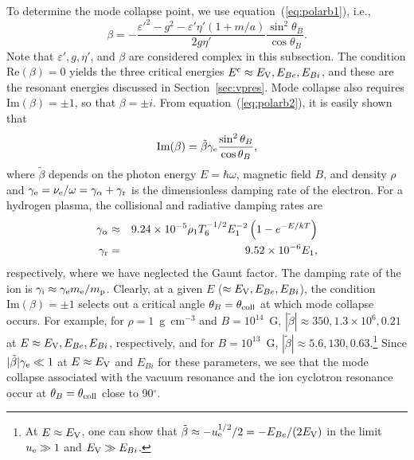 \documentclass{mn2e}
\newcommand{\be}{\begin{equation}}
\newcommand{\ee}{\end{equation}}
\newcommand{\ba}{\begin{eqnarray}}
\newcommand{\ea}{\end{eqnarray}}
\newcommand{\lp}{\left(}
\newcommand{\rp}{\right)}
\newcommand{\mpr}{m_{\rm p}}
\newcommand{\me}{m_{\rm e}}
\newcommand{\Ebe}{E_{Be}}
\newcommand{\Ebi}{E_{Bi}}
\newcommand{\thetab}{\theta_B}
\newcommand{\polarb}{\beta}
\newcommand{\uel}{u_{\rm e}}
\newcommand{\nudamp}{\nu_{\rm e}}
\newcommand{\gamdampi}{\gamma_{\rm i}}
\newcommand{\gamdampre}{\gamma_{\rm r}}
\newcommand{\gamdampce}{\gamma_{\alpha}}
\newcommand{\vpa}{a}
\newcommand{\vpm}{m}
\newcommand{\Evp}{E_{\rm V}}
\newcommand{\polarbmcp}{\tilde{\beta}}
\newcommand{\gamdampe}{\gamma_{\rm e}}
\newcommand{\thetamcp}{\theta_{\rm coll}}
\begin{document}
{To determine the mode collapse point, we use equation~(\ref{eq:polarb1}),
i.e.,
\be
\polarb = -\frac{\varepsilon'^2-g^2-\varepsilon'\eta'
\lp 1+\vpm/\vpa\rp}{2g\eta'}\frac{\sin^2\thetab}{\cos\thetab}.
 \label{eq:polarb2}
\ee
Note that $\varepsilon', g, \eta'$, and $\polarb$ are considered
complex in this subsection.
The condition $\mbox{Re}(\polarb)=0$ yields the three
critical energies $E^{\rm c}\approx \Evp, \Ebe, \Ebi$, and these
are the resonant energies discussed in Section~\ref{sec:vpres}.
Mode collapse also requires $\mbox{Im}(\polarb)=\pm 1$, so that
$\polarb=\pm i$.  From equation~(\ref{eq:polarb2}), it is easily
shown that
\be
\mbox{Im}(\polarb)=\polarbmcp\gamdampe\frac{\sin^2\thetab}{\cos\thetab},
 \label{eq:polarbim}
\ee
where $\polarbmcp$ depends on the photon energy $E=\hbar\omega$, magnetic
field $B$, and density $\rho$ and
$\gamdampe=\nudamp/\omega=\gamdampce+\gamdampre$ is the dimensionless
damping rate of the electron. For a hydrogen plasma, the collisional
and radiative damping rates are
\ba
\gamdampce & \approx & 9.24\times 10^{-5} \rho_1 T_6^{-1/2} E_1^{-2}
 \lp 1-e^{-E/kT}\rp \\
\gamdampre & = & 9.52\times 10^{-6} E_1, \label{eq:dampe}
\ea
respectively, where we have neglected the Gaunt factor.
The damping rate of the ion is $\gamdampi\approx\gamdampe\me/\mpr$.
Clearly, at a given $E$ ($\approx \Evp, \Ebe, \Ebi$), the condition
$\mbox{Im}(\polarb)=\pm 1$ selects out a critical angle $\thetab=\thetamcp$
at which mode collapse occurs.
For example, for $\rho=1$~g~cm$^{-3}$ and $B=10^{14}$~G,
$|\polarbmcp| \approx 350, 1.3\times 10^6, 0.21$
at $E\approx\Evp, \Ebe, \Ebi$, respectively, and for $B=10^{13}$~G,
$|\polarbmcp| \approx 5.6, 130, 0.63$.\footnote{
At $E\approx\Evp$, one can show that
$\polarbmcp \approx -\uel^{1/2}/2=-\Ebe/(2\Evp)$ in the limit
$\uel\gg 1$ and $\Evp\gg\Ebi$.
}
Since $|\polarbmcp|\gamdampe\ll 1$ at $E\approx\Evp$ and $\Ebi$ for
these parameters, we
see that the mode collapse associated with the vacuum resonance
and the ion cyclotron resonance occur at $\thetab=\thetamcp$
close to 90$^\circ$.

}
\end{document}
